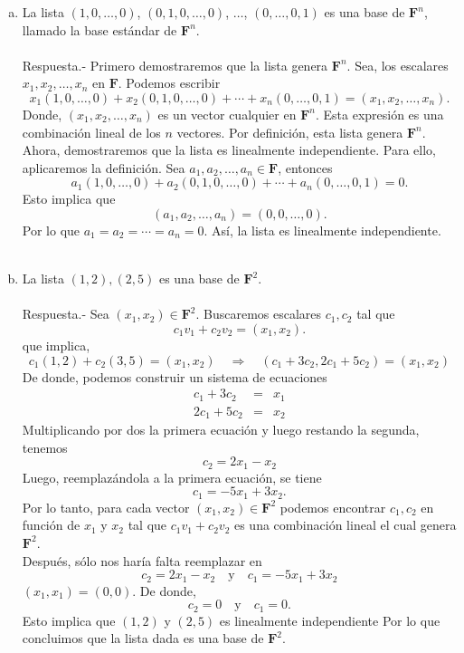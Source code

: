 \begin{enumerate}[\bfseries 1.]
\begin{enumerate}[(a)]
	    \item La lista $(1,0,\ldots,0)$, $(0,1,0,\ldots,0)$, $\ldots$, $(0,\ldots,0,1)$ es una base de $\textbf{F}^n$, llamado la base estándar de $\textbf{F}^n$.\\\\
		Respuesta.-\; Primero demostraremos que la lista genera $\textbf{F}^n$.  Sea, los escalares $x_1,x_2,\ldots,x_n$ en $\textbf{F}$. Podemos escribir
		$$x_1(1,0,\ldots,0)+x_2(0,1,0,\ldots,0)+\cdots+x_n(0,\ldots,0,1)=\left(x_1,x_2,\ldots,x_n\right).$$
		Donde, $(x_1,x_2,\ldots,x_n)$ es un vector cualquier en $\textbf{F}^n$. Esta expresión es una combinación lineal de los $n$ vectores. Por definición, esta lista genera $\textbf{F}^n$.\\
		Ahora, demostraremos que la lista es linealmente independiente. Para ello, aplicaremos la definición. Sea $a_1,a_2,\ldots,a_n\in \textbf{F}$, entonces
		$$a_1(1,0,\ldots,0)+a_2(0,1,0,\ldots,0)+\cdots+a_n(0,\ldots,0,1)=0.$$
		Esto implica que
		$$(a_1,a_2,\ldots,a_n)=(0,0,\ldots,0).$$
		Por lo que $a_1=a_2=\cdots=a_n=0$. Así, la lista es linealmente independiente.\\\\

	    \item  La lista $(1,2),(2,5)$ es una base de $\textbf{F}^2$.\\\\
		Respuesta.-\; Sea $(x_1,x_2)\in \textbf{F}^2$. Buscaremos escalares $c_1,c_2$ tal que
		$$c_1v_1+c_2v_2=(x_1,x_2).$$
		que implica,
		$$c_1(1,2)+c_2(3,5)=(x_1,x_2)\quad \Rightarrow \quad (c_1+3c_2,2c_1+5c_2)=(x_1,x_2)$$
		De donde, podemos construir un sistema de ecuaciones
		$$
		\begin{array}{rcl}
		    c_1+3c_2&=&x_1\\
		    2c_1+5c_2&=&x_2
		\end{array}
		$$
		Multiplicando por dos la primera ecuación y luego restando la segunda, tenemos
		$$c_2=2x_1-x_2$$
		Luego, reemplazándola a la primera ecuación, se tiene
		$$c_1=-5x_1+3x_2.$$
		Por lo tanto, para cada vector $(x_1,x_2)\in \textbf{F}^2$ podemos encontrar $c_1,c_2$ en función de $x_1$ y $x_2$ tal que $c_1v_1+c_2v_2$ es una combinación lineal el cual genera $\textbf{F}^2$.\\
		Después, sólo nos haría falta reemplazar en
		$$c_2=2x_1-x_2\quad \mbox{y}\quad c_1=-5x_1+3x_2$$
		$(x_1,x_1)=(0,0)$. De donde,
		$$c_2=0\quad \mbox{y}\quad c_1=0.$$
		Esto implica que $(1,2)$ y $(2,5)$ es linealmente independiente Por lo que concluimos que la lista dada es una base de $\textbf{F}^2$.\\\\


\end{enumerate}
\end{enumerate}

